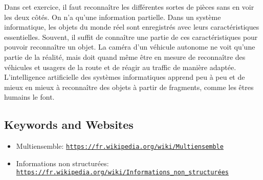 \documentclass[a4paper,11pt]{report}
\newcommand{\BrochureUrlText}[1]{\texttt{#1}}
\begin{document}
Dans cet exercice, il faut reconnaître les différentes sortes de pièces sans en voir les deux côtés. On n’a qu’une information partielle. Dans un système informatique, les objets du monde réel sont enregistrés avec leurs caractéristiques essentielles. Souvent, il suffit de connaître une partie de ces caractéristiques pour pouvoir reconnaître un objet. La caméra d’un véhicule autonome ne voit qu’une partie de la réalité, mais doit quand même être en mesure de reconnaître des véhicules et usagers de la route et de réagir au traffic de manière adaptée. L’intelligence artificielle des systèmes informatiques apprend peu à peu et de mieux en mieux à reconnaître des objets à partir de fragments, comme les êtres humains le font.

{\raggedright

\subsection*{Keywords and Websites}

\begin{itemize}
  \item Multiensemble: \href{https://fr.wikipedia.org/wiki/Multiensemble}{\BrochureUrlText{https://fr.wikipedia.org/wiki/Multiensemble}}
  \item Informations non structurées: \href{https://fr.wikipedia.org/wiki/Informations_non_structur\%C3\%A9es}{\BrochureUrlText{https://fr.wikipedia.org/wiki/Informations\_non\_structurées}}
\end{itemize}


}
\end{document}
